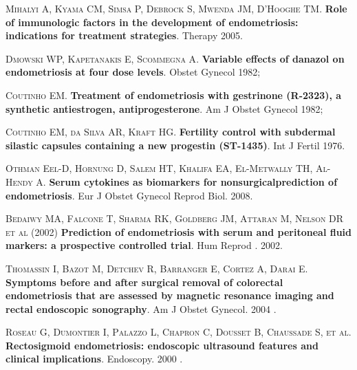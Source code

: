 \documentclass[12pt]{article} %
\begin{document}
\vspace{0,5cm}

\textsc{Mihalyi A, Kyama CM, Simsa P, Debrock S, Mwenda JM, D'Hooghe TM}.
\textbf{Role of immunologic factors in the development of endometriosis: indications for treatment strategies}. Therapy 2005.

\vspace{0,5cm}

\textsc{Dmowski WP, Kapetanakis E, Scommegna A}. \textbf{Variable effects of danazol on endometriosis at four dose levels}. Obstet Gynecol 1982;

\vspace{0,5cm}

\textsc{ Coutinho EM}.\textbf{ Treatment of endometriosis with gestrinone (R-2323), a synthetic antiestrogen, antiprogesterone}. Am J Obstet Gynecol 1982; 

\vspace{0,5cm}
 
\textsc{Coutinho EM, da Silva AR, Kraft HG}. \textbf{Fertility control with subdermal silastic capsules containing a new progestin (ST-1435)}. Int J Fertil 1976.

\vspace{0,5cm}

\textsc{Othman Eel-D, Hornung D, Salem HT, Khalifa EA, El-Metwally
TH, Al-Hendy A}.\textbf{ Serum cytokines as biomarkers for nonsurgicalprediction of endometriosis}. Eur J Obstet Gynecol Reprod Biol.
2008.

\vspace{0,5cm}

\textsc{Bedaiwy MA, Falcone T, Sharma RK, Goldberg JM, Attaran M,
Nelson DR et al} (2002)\textbf{ Prediction of endometriosis with serum
and peritoneal fluid markers: a prospective controlled trial}. Hum
Reprod . 2002.

\vspace{0,5cm}

\textsc{Thomassin I, Bazot M, Detchev R, Barranger E, Cortez A,
Darai E}.\textbf{ Symptoms before and after surgical removal of
colorectal endometriosis that are assessed by magnetic
resonance imaging and rectal endoscopic sonography}. Am J
Obstet Gynecol. 2004 .

\vspace{0,5cm}

\textsc{Roseau G, Dumontier I, Palazzo L, Chapron C, Dousset B,
Chaussade S, et al}.\textbf{ Rectosigmoid endometriosis: endoscopic
ultrasound features and clinical implications}. Endoscopy.
2000 .
\end{document}
